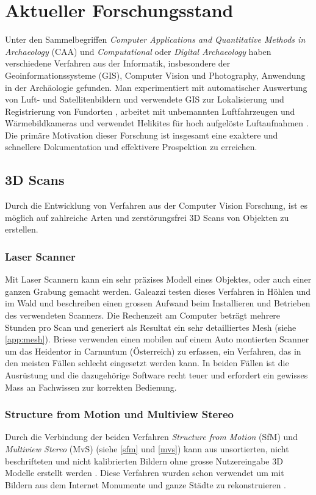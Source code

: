 \chapter{Aktueller Forschungsstand}

	Unter den Sammelbegriffen \emph{Computer Applications and Quantitative Methods in Archaeology} (CAA) und \emph{Computational} oder \emph{Digital Archaeology} haben verschiedene Verfahren aus der Informatik, insbesondere der Geoinformationssysteme (GIS), Computer Vision und Photography, Anwendung in der Archäologie gefunden.
	Man experimentiert mit automatischer Auswertung von Luft- und Satellitenbildern und verwendete GIS zur Lokalisierung und Registrierung von Fundorten , arbeitet mit unbemannten Luftfahrzeugen und Wärmebildkameras  und verwendet Helikites für hoch aufgelöste Luftaufnahmen .
	Die primäre Motivation dieser Forschung ist insgesamt eine exaktere und schnellere Dokumentation und effektivere Prospektion zu erreichen.

	\section{3D Scans}
		Durch die Entwicklung von Verfahren aus der Computer Vision Forschung, ist es möglich auf zahlreiche Arten und zerstörungsfrei 3D Scans von Objekten zu erstellen.
		\subsection{Laser Scanner}
			Mit Laser Scannern kann ein sehr präzises Modell eines Objektes, oder auch einer ganzen Grabung gemacht werden. Galeazzi  \etal {} testen dieses Verfahren in Höhlen und im Wald und beschreiben einen grossen Aufwand beim Installieren und Betrieben des verwendeten Scanners. Die Rechenzeit am Computer beträgt mehrere Stunden pro Scan und generiert als Resultat ein sehr detailliertes Mesh (siehe \autoref{app:mesh}).
			Briese \etal {} verwenden einen mobilen auf einem Auto montierten Scanner um das Heidentor in Carnuntum (Österreich) zu erfassen, ein Verfahren, das in den meisten Fällen schlecht eingesetzt werden kann.
			In beiden Fällen ist die Ausrüstung und die dazugehörige Software recht teuer und erfordert ein gewisses Mass an Fachwissen zur korrekten Bedienung.

		\subsection{Structure from Motion und Multiview Stereo}
			Durch die Verbindung der beiden Verfahren \emph{Structure from Motion} (SfM) und \emph{Multiview Stereo} (MvS) (siehe \autoref{sfm} und \autoref{mvs}) kann aus unsortierten, nicht beschrifteten und nicht kalibrierten Bildern ohne grosse Nutzereingabe 3D Modelle erstellt werden . Diese Verfahren wurden schon verwendet um mit Bildern aus dem Internet Monumente und ganze Städte zu rekonstruieren .
		
